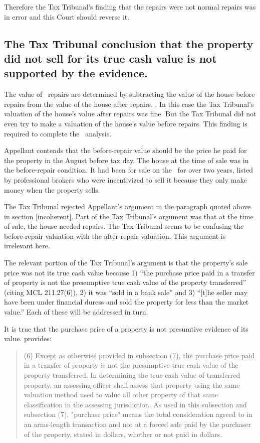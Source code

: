 \documentclass[12pt,\documentclassflag]{michiganCourtOfAppealsBrief}
\def\mathieuGast{\pincite[l]{MCL}{211.27(2)}}
\begin{document}
Therefore the Tax Tribunal's finding that the repairs were not normal repairs was in error and this Court should reverse it.

\subsection{The Tax Tribunal conclusion that the property did not sell for its true cash value is not supported by the evidence.}

The value of \mathieuGast\ repairs are determined by subtracting the value of the house before repairs from the value of the house after repairs. . In this case the Tax Tribunal's valuation of the house's value after repairs was fine. But the Tax Tribunal did not even try to make a valuation of the house's value before repairs. This finding is required to complete the \mathieuGast\ analysis.

Appellant contends that the before-repair value should be the price he paid for the property in the August before tax day. The house at the time of sale was in the before-repair condition. It had been for sale on the \MLS\ for over two years, listed by professional brokers who were incentivized to sell it because they only make money when the property sells.

The Tax Tribunal rejected Appellant's argument in the paragraph quoted above in section \ref{incoherent}. Part of the Tax Tribunal's argument was that at the time of sale, the house needed repairs. The Tax Tribunal seems to be confusing the before-repair valuation with the after-repair valuation. This argument is irrelevant here.

The relevant portion of the Tax Tribunal's argument is that the property's sale price was not its true cash value because 1) ``the purchase price paid in a transfer of property is not the presumptive true cash value of the property transferred'' (citing MCL 211.27(6)), 2)  it was ``sold in a bank sale'' and 3) ``[t]he seller may have been under financial duress and sold the property for less than the market value.'' Each of these will be addressed in turn.

It is true that the purchase price of a property is not presumtive evidence of its value.  provides:

\begin{quote} (6) Except as otherwise provided in subsection (7), the purchase price paid in a transfer of property is not the presumptive true cash value of the property transferred. In determining the true cash value of transferred property, an assessing officer shall assess that property using the same valuation method used to value all other property of that same classification in the assessing jurisdiction. As used in this subsection and subsection (7), "purchase price" means the total consideration agreed to in an arms-length transaction and not at a forced sale paid by the purchaser of the property, stated in dollars, whether or not paid in dollars.
\end{quote}
\end{document}

